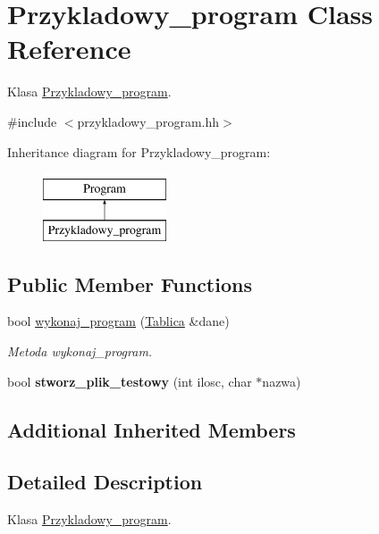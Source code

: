 \hypertarget{class_przykladowy__program}{\section{Przykladowy\-\_\-program Class Reference}
\label{class_przykladowy__program}
}


Klasa \hyperlink{class_przykladowy__program}{Przykladowy\-\_\-program}.  




{\ttfamily \#include $<$przykladowy\-\_\-program.\-hh$>$}

Inheritance diagram for Przykladowy\-\_\-program\-:\begin{figure}[H]
\begin{center}
\leavevmode
\includegraphics[height=2.000000cm]{class_przykladowy__program}
\end{center}
\end{figure}
\subsection*{Public Member Functions}
\begin{DoxyCompactItemize}
\item 
bool \hyperlink{class_przykladowy__program_a4215d5b5562be2a26f601dec4d4f6501}{wykonaj\-\_\-program} (\hyperlink{class_tablica}{Tablica} \&dane)
\begin{DoxyCompactList}\small\item\em Metoda wykonaj\-\_\-program. \end{DoxyCompactList}\item 
\hypertarget{class_przykladowy__program_a01cb33d6717d2dfd159f4607b7c8269f}{bool {\bfseries stworz\-\_\-plik\-\_\-testowy} (int ilosc, char $\ast$nazwa)}\label{class_przykladowy__program_a01cb33d6717d2dfd159f4607b7c8269f}

\end{DoxyCompactItemize}
\subsection*{Additional Inherited Members}


\subsection{Detailed Description}
Klasa \hyperlink{class_przykladowy__program}{Przykladowy\-\_\-program}. 

